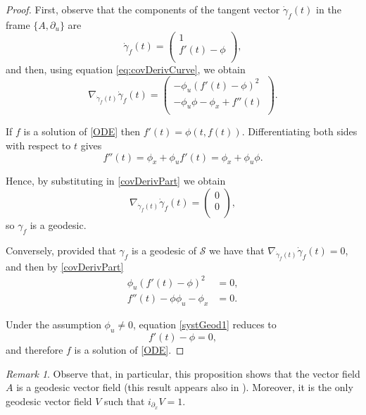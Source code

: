 \documentclass{article}
\theoremstyle{remark}
\newtheorem{remark}{Remark}[section]
\theoremstyle{definition}
\begin{document}
\begin{proof}
First, observe that the components of the tangent vector $\dot{\gamma}_f(t)$ in the frame $\{A,\partial_u\}$ are
\begin{equation}\label{tangent}
\dot{\gamma}_f(t)=\begin{pmatrix}
    1\\
    f'(t)-\phi\\
\end{pmatrix},
\end{equation}
and then, using equation \eqref{eq:covDerivCurve}, we obtain 
\begin{equation}\label{covDerivPart}
    \nabla_{\dot{\gamma}_f(t)}\dot{\gamma}_f(t)=\begin{pmatrix}
        - \phi_u(f'(t)-\phi)^2\\
        -\phi_u \phi-\phi_x+f''(t)\\
    \end{pmatrix}.    
\end{equation}

If $f$ is a solution of \eqref{ODE} then $f'(t)=\phi(t,f(t))$. Differentiating both sides with respect to $t$ gives
$$
f''(t)=\phi_x+\phi_uf'(t)=\phi_x+\phi_u\phi.
$$

Hence, by substituting in \eqref{covDerivPart} we obtain
$$
\nabla_{\dot{\gamma}_f(t)}\dot{\gamma}_f(t)=
\begin{pmatrix}
    0\\
    0\\
\end{pmatrix},
$$
so $\gamma_f$ is a geodesic.

Conversely, provided that $\gamma_f$ is a geodesic of $\mathcal{S}$ we have that $\nabla_{\dot{\gamma}_f(t)}\dot{\gamma}_f(t)=0$, and then by \eqref{covDerivPart}
\begin{subequations}\label{systGeod}
\begin{align}
\phi_u\left( f'(t)- \phi\right)^2&=0,\label{systGeod1}\\%
f''(t) - \phi \phi_u - \phi_x &= 0.\label{systGeod2}
\end{align}
\end{subequations}


Under the assumption $\phi_u\neq 0$, equation \eqref{systGeod1} reduces to 
\begin{equation}\label{eq1}
f'(t)-\phi=0,    
\end{equation}
and therefore $f$ is a solution of \eqref{ODE}.
\end{proof}
\begin{remark}
Observe that, in particular, this proposition shows that the vector field $A$ is a geodesic vector field (this result appears also in  \cite{Bayrakdar2018a}). Moreover, it is the only geodesic vector field $V$ such that $i_{\partial_x} V=1$.
\end{remark}
\end{document}
